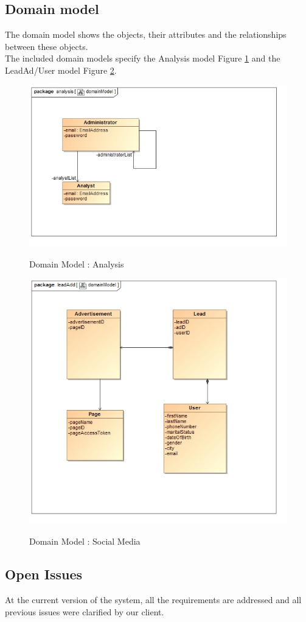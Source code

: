 \documentclass{article}
\begin{document}
\subsection{Domain model}\label{sec:domain}
The domain model shows the objects, their attributes and the relationships between these objects. \\
The included domain models specify the Analysis model Figure \ref{fig:domain_admin} and the LeadAd/User model Figure \ref{fig:domain_user}.
\begin{figure}[H]
\includegraphics[width=\textwidth]{images/class__analysis__domainModel.jpg}  \\
\caption{Domain Model : Analysis}
\label{fig:domain_admin}
\end{figure}

\begin{figure}[H]
\includegraphics[width=\textwidth]{images/class__leadAdd__domainModel.jpg}  \\
\caption{Domain Model : Social Media}
\label{fig:domain_user}
\end{figure}


\subsection{Open Issues}\label{sec:open}
At the current version of  the system, all the requirements are addressed and all previous issues were clarified by our client.
\end{document}
